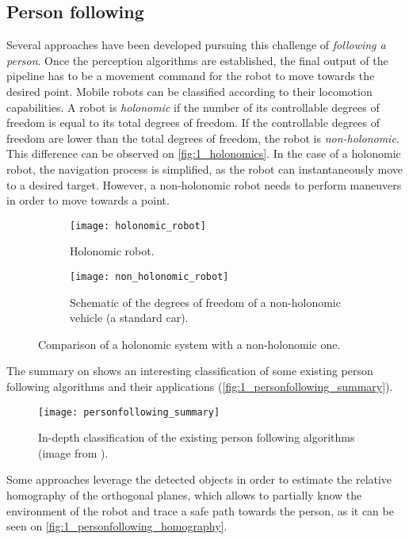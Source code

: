 \subsection{Person following}
Several approaches have been developed pursuing this challenge of \textit{following a person}. Once the perception algorithms are established, the final output of the pipeline has to be a movement command for the robot to move towards the desired point. Mobile  robots can be classified according to their locomotion capabilities. A robot is \textit{holonomic} if the number of its controllable degrees of freedom is equal to its total degrees of freedom. If the controllable degrees of freedom are lower than the total degrees of freedom, the robot is \textit{non-holonomic}. This difference can be observed on \autoref{fig:1_holonomics}. In the case of a holonomic robot, the navigation process is simplified, as the robot can instantaneously move to a desired target. However, a non-holonomic robot needs to perform maneuvers in order to move towards a point.\\


\begin{figure}[h]
	\centering
	\begin{subfigure}[t]{0.45\linewidth}
		\centering
		\texttt{[image: holonomic\_robot]}
		\caption{Holonomic robot.}
	\end{subfigure}
	\begin{subfigure}[t]{0.45\linewidth}
	\centering
	\texttt{[image: non\_holonomic\_robot]}
	\caption{Schematic of the degrees of freedom of a non-holonomic vehicle (a standard car).}
	\end{subfigure}
	\caption{Comparison of a holonomic system with a non-holonomic one.}
	\label{fig:1_holonomics}
\end{figure}

The summary on \cite{personfollowing_summary} shows an interesting classification of some existing person following algorithms and their applications (\autoref{fig:1_personfollowing_summary}).


\begin{figure}[h]
	\centering
	\texttt{[image: personfollowing\_summary]}
	\caption{In-depth classification of the existing person following algorithms (image from \cite{personfollowing_summary}).}
	\label{fig:1_personfollowing_summary}
\end{figure}

Some approaches leverage the detected objects in order to estimate the relative homography of the orthogonal planes, which allows to partially know the environment of the robot and trace a safe path towards the person, as it can be seen on \autoref{fig:1_personfollowing_homography}.

